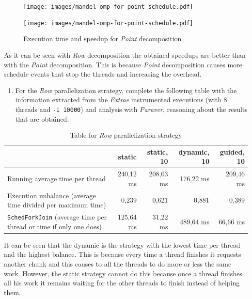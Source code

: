 \documentclass[a4paper]{article}
\begin{document}
\begin{figure}[H]
	\centering
	\begin{minipage}[t]{0.49\textwidth}
		\texttt{[image: images/mandel-omp-for-point-schedule.pdf]}
	\end{minipage}
	\begin{minipage}[t]{0.49\textwidth}
		\texttt{[image: images/mandel-omp-for-point-schedule.pdf]}
	\end{minipage}
	\caption{Execution time and speedup for \textit{Point} decomposition}
\end{figure}

As it can be seen with \textit{Row} decomposition the obtained speedups are better than with the \textit{Point} decomposition. This is because \textit{Point} decomposition causes more schedule events that stop the threads and increasing the overhead.

\begin{enumerate}[resume]
	\item For the \textit{Row} parallelization strategy, complete the following table with the information extracted from the \textit{Extrae} instrumented executions (with 8 threads and \texttt{-i 10000}) and analysis with \textit{Paraver}, reasoning about the results that are obtained.
\end{enumerate}

\begin{table}[H]
	\centering
	\tablinesep=0.5cm
	\begin{tabular}{p{5cm}|rrrr}
		& \textbf{static} & \textbf{static, 10} 
		& \textbf{dynamic, 10} & \textbf{guided, 10} \\
		\hline
		Running average time per thread & 
		240,12 ms & 208,03 ms & 176,22 ms & 209,46 ms \\
		Execution unbalance (average time divided per maximum time) & 
		0,239 & 0,621 & 0,881 & 0,389 \\
		\texttt{SchedForkJoin} (average time per thread or time if only one does) & 
		125,64 ms & 31,22 ms & 489,64 ms & 66,66 ms
	\end{tabular}
	\caption{Table for \textit{Row} parallelization strategy}
\end{table}

It can be seen that the dynamic is the strategy with the lowest time per thread and the highest balance. This is because every time a thread finishes it requests another chunk and this causes to all the threads to do more or less the same work. However, the static strategy cannot do this because once a thread finishes all his work it remains waiting for the other threads to finish instead of helping them.
\end{document}

